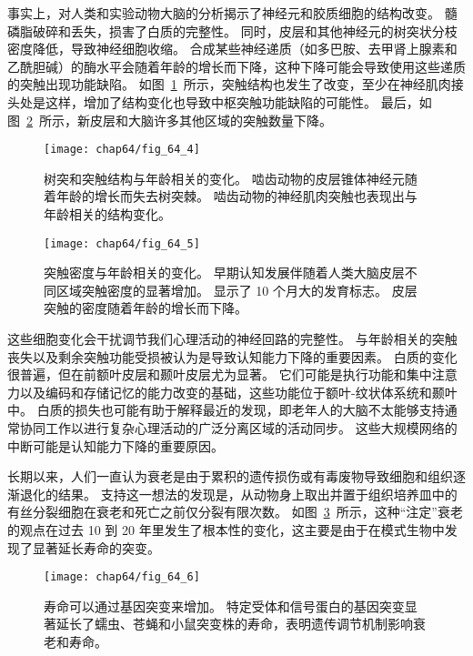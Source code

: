 事实上，对人类和实验动物大脑的分析揭示了神经元和胶质细胞的结构改变。
髓磷脂破碎和丢失，损害了白质的完整性。
同时，皮层和其他神经元的树突状分枝密度降低，导致神经细胞收缩。
合成某些神经递质（如多巴胺、去甲肾上腺素和乙酰胆碱）的酶水平会随着年龄的增长而下降，这种下降可能会导致使用这些递质的突触出现功能缺陷。
如图~\ref{fig:64_4}~所示，突触结构也发生了改变，至少在神经肌肉接头处是这样，增加了结构变化也导致中枢突触功能缺陷的可能性。
最后，如图~\ref{fig:64_5}~所示，新皮层和大脑许多其他区域的突触数量下降。


\begin{figure}[htbp]
	\centering
	\texttt{[image: chap64/fig\_64\_4]}
	\caption{树突和突触结构与年龄相关的变化。
		啮齿动物的皮层锥体神经元随着年龄的增长而失去树突棘。
		啮齿动物的神经肌肉突触也表现出与年龄相关的结构变化。}
	\label{fig:64_4}
\end{figure}


\begin{figure}[htbp]
	\centering
	\texttt{[image: chap64/fig\_64\_5]}
	\caption{突触密度与年龄相关的变化。
		早期认知发展伴随着人类大脑皮层不同区域突触密度的显著增加。
		显示了 10 个月大的发育标志。
		皮层突触的密度随着年龄的增长而下降\cite{huttenlocher2009neural}。}
	\label{fig:64_5}
\end{figure}


这些细胞变化会干扰调节我们心理活动的神经回路的完整性。
与年龄相关的突触丧失以及剩余突触功能受损被认为是导致认知能力下降的重要因素。
白质的变化很普遍，但在前额叶皮层和颞叶皮层尤为显著。
它们可能是执行功能和集中注意力以及编码和存储记忆的能力改变的基础，这些功能位于额叶-纹状体系统和颞叶中。
白质的损失也可能有助于解释最近的发现，即老年人的大脑不太能够支持通常协同工作以进行复杂心理活动的广泛分离区域的活动同步。
这些大规模网络的中断可能是认知能力下降的重要原因。


长期以来，人们一直认为衰老是由于累积的遗传损伤或有毒废物导致细胞和组织逐渐退化的结果。
支持这一想法的发现是，从动物身上取出并置于组织培养皿中的有丝分裂细胞在衰老和死亡之前仅分裂有限次数。
如图~\ref{fig:64_6}~所示，这种“注定”衰老的观点在过去 10 到 20 年里发生了根本性的变化，这主要是由于在模式生物中发现了显著延长寿命的突变。


\begin{figure}[htbp]
	\centering
	\texttt{[image: chap64/fig\_64\_6]}
	\caption{寿命可以通过基因突变来增加。
		特定受体和信号蛋白的基因突变显著延长了蠕虫、苍蝇和小鼠突变株的寿命，表明遗传调节机制影响衰老和寿命\cite{hekimi2003genetics,lin1998extended,brown1996dwarf}。}
	\label{fig:64_6}
\end{figure}


